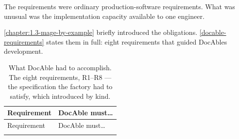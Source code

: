 The requirements were ordinary production-software requirements. What was unusual was the implementation capacity available to one engineer.


\autoref{chapter:1.3-mage-by-example} briefly introduced the obligations. \autoref{docable-requirements} states them in full: eight requirements that guided DocAble\textquotesingle s development.

{\footnotesize
\begin{longtable}[]{@{}
  >{\raggedright\arraybackslash}p{}
  >{\raggedright\arraybackslash}p{}@{}}
\caption[The DocAble requirements]{What DocAble had to accomplish. The eight requirements, R1--R8 --- the specification the factory had to satisfy, which  introduced by kind.}\label{docable-requirements}\tabularnewline
\toprule\noalign{}
\begin{minipage}[b]{\linewidth}\raggedright
Requirement
\end{minipage} & \begin{minipage}[b]{\linewidth}\raggedright
DocAble must\ldots{}
\end{minipage} \\
\midrule\noalign{}
\endfirsthead
\toprule\noalign{}
\begin{minipage}[b]{\linewidth}\raggedright
Requirement
\end{minipage} & \begin{minipage}[b]{\linewidth}\raggedright
DocAble must\ldots{}
\end{minipage} \\
\midrule\noalign{}
\endhead
\bottomrule\noalign{}
\endlastfoot


\end{longtable}}
